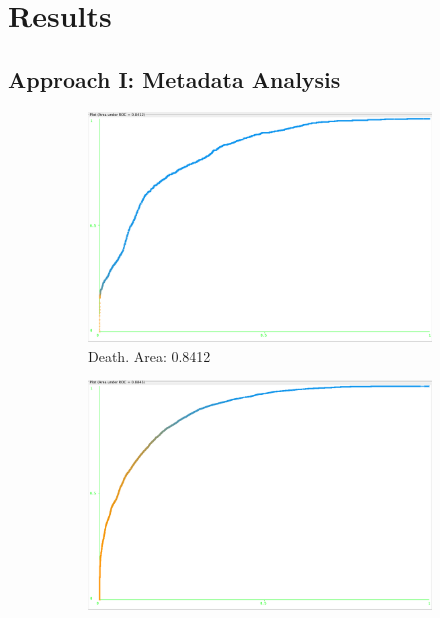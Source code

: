 \documentclass[11pt, notitlepage,abstracton,oneside]{article}   	%
\begin{document}
\section{Results}

\subsection{Approach I: Metadata Analysis}

\begin{figure}[ht]
    \centering
    \begin{subfigure}[b]{0.3\textwidth}
        \centering
        \includegraphics[width=\textwidth]{figures/death}
        \caption{Death. Area: 0.8412}
        \label{fig:death}
    \end{subfigure}
    \hfill
    \begin{subfigure}[b]{0.3\textwidth}
        \centering
        \includegraphics[width=\textwidth]{figures/injury}

\end{subfigure}
\end{figure}
\end{document}
